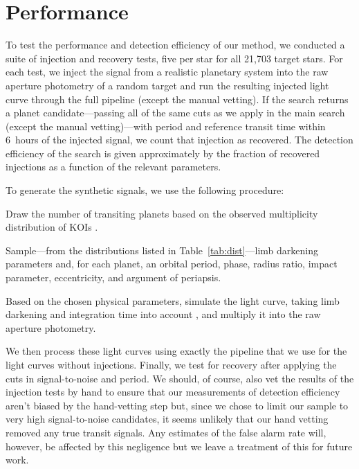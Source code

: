 \documentclass[12pt,preprint]{aastex}
\newcommand{\Tab}[1]{Table~\ref{tab:#1}}
\newcommand{\tab}[1]{\Tab{#1}}
\newcommand{\sectlabel}[1]{\label{sect:#1}}
\begin{document}
\section{Performance}
\sectlabel{perform}

To test the performance and detection efficiency of our method, we conducted a
suite of injection and recovery tests, five per
star for all 21,703 target stars.
For each test, we inject the signal from a realistic planetary system into the
raw aperture photometry of a random target and run the resulting injected
light curve through the full pipeline (except the manual vetting).
If the search returns a planet candidate---passing all of the same cuts as we
apply in the main search (except the manual vetting)---with period and
reference transit time within 6~hours of the injected signal, we count that
injection as recovered.
The detection efficiency of the search is given approximately by the fraction
of recovered injections as a function of the relevant parameters.

To generate the synthetic signals, we use the following procedure:
\begin{enumerate}
{\item Draw the number of transiting planets based on the observed
multiplicity distribution of KOIs \citep{Burke:2014}.}
{\item Sample---from the distributions listed in
\tab{dist}---limb darkening parameters and, for each planet, an orbital
period, phase, radius ratio, impact parameter, eccentricity, and argument of
periapsis.}
{\item Based on the chosen physical parameters, simulate the light curve,
taking limb darkening and integration time into account \citep{Mandel:2002,
Kipping:2010}, and multiply it into the raw aperture photometry.}
\end{enumerate}
We then process these light curves using exactly the pipeline that we use for
the light curves without injections.
Finally, we test for recovery after applying the cuts in signal-to-noise and
period.
We should, of course, also vet the results of the injection tests by hand
to ensure that our measurements of detection efficiency aren't biased by the
hand-vetting
step but, since we chose to limit our sample to very high signal-to-noise
candidates, it seems unlikely that our hand vetting removed any true transit
signals.
Any estimates of the false alarm rate will, however, be affected by this
negligence but we leave a treatment of this for future work.
\end{document}
